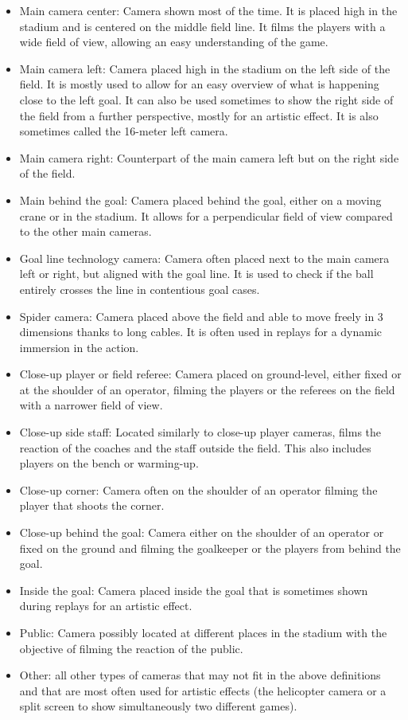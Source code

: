 \documentclass[final]{cvsports}
\begin{document}
\begin{itemize}
    \item Main camera center: Camera shown most of the time. It is placed high in the stadium and is centered on the middle field line. It films the players with a wide field of view, allowing an easy understanding of the game.
    \item Main camera left: Camera placed high in the stadium on the left side of the field. It is mostly used to allow for an easy overview of what is happening close to the left goal. It can also be used sometimes to show the right side of the field from a further perspective, mostly for an artistic effect. It is also sometimes called the 16-meter left camera.
    \item Main camera right: Counterpart of the main camera left but on the right side of the field.
    \item Main behind the goal: Camera placed behind the goal, either on a moving crane or in the stadium. It allows for a perpendicular field of view compared to the other main cameras.
    \item Goal line technology camera: Camera often placed next to the main camera left or right, but aligned with the goal line. It is used to check if the ball entirely crosses the line in contentious goal cases.
    \item Spider camera: Camera placed above the field and able to move freely in 3 dimensions thanks to long cables. It is often used in replays for a dynamic immersion in the action.
    \item Close-up player or field referee: Camera placed on ground-level, either fixed or at the shoulder of an operator, filming the players or the referees on the field with a narrower field of view. 
    \item Close-up side staff: Located similarly to close-up player cameras, films the reaction of the coaches and the staff outside the field. This also includes players on the bench or warming-up.
    \item Close-up corner: Camera often on the shoulder of an operator filming the player that shoots the corner.
    \item Close-up behind the goal: Camera either on the shoulder of an operator or fixed on the ground and filming the goalkeeper or the players from behind the goal.
    \item Inside the goal: Camera placed inside the goal that is sometimes shown during replays for an artistic effect.
    \item Public: Camera possibly located at different places in the stadium with the objective of filming the reaction of the public.
    \item Other: all other types of cameras that may not fit in the above definitions and that are most often used for artistic effects (\eg the helicopter camera or a split screen to show simultaneously two different games).
\end{itemize}
\end{document}
